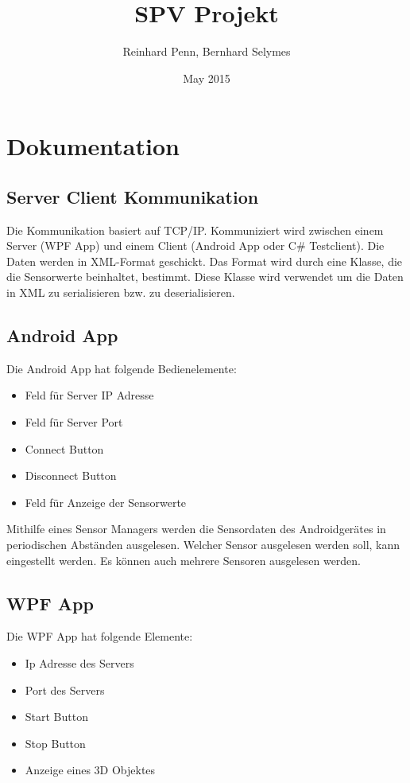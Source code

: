 \documentclass[12pt,a4paper]{article}
\begin{document}
\title{SPV Projekt}
\author{Reinhard Penn, Bernhard Selymes}
\date{May 2015}

\normalsize




\newcommand{\Uebung}{SensorValues}
\newcommand{\srcpath}{../../src}
\newcommand{\screens}{./Screenshots}



\section{Dokumentation}

\subsection{Server Client Kommunikation}
Die Kommunikation basiert auf TCP/IP. Kommuniziert wird zwischen einem Server (WPF App) und einem Client (Android App oder C\# Testclient). Die Daten werden in XML-Format geschickt.
Das Format wird durch eine Klasse, die die Sensorwerte beinhaltet, bestimmt. Diese Klasse wird verwendet um die Daten in XML zu serialisieren bzw. zu deserialisieren.

\subsection{Android App}
Die Android App hat folgende Bedienelemente:
\begin{itemize}[noitemsep]
	\item Feld für Server IP Adresse
	\item Feld für Server Port
	\item Connect Button
	\item Disconnect Button
	\item Feld für Anzeige der Sensorwerte
\end{itemize}

Mithilfe eines Sensor Managers werden die Sensordaten des Androidgerätes in periodischen Abständen ausgelesen. Welcher Sensor ausgelesen werden soll, kann eingestellt werden. Es können auch mehrere Sensoren ausgelesen werden.

\subsection{WPF App}
Die WPF App hat folgende Elemente:
\begin{itemize}[noitemsep]
	\item Ip Adresse des Servers
	\item Port des Servers
	\item Start Button
	\item Stop Button
	\item Anzeige eines 3D Objektes
\end{itemize}
\end{document}
